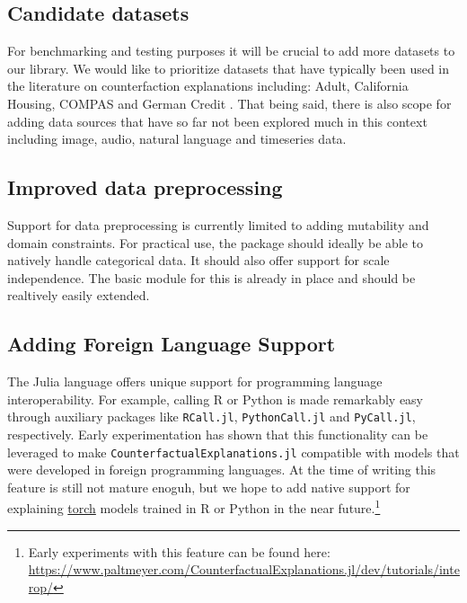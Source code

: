 \documentclass{juliacon}
\begin{document}
\hypertarget{candidate-datasets}{%
\subsection{Candidate datasets}\label{candidate-datasets}}

For benchmarking and testing purposes it will be crucial to add more
datasets to our library. We would like to prioritize datasets that have
typically been used in the literature on counterfaction explanations
including: Adult, California Housing, COMPAS and German Credit
\cite{karimi2020survey}. That being said, there is also scope for adding
data sources that have so far not been explored much in this context
including image, audio, natural language and timeseries data.

\hypertarget{improved-data-preprocessing}{%
\subsection{Improved data
preprocessing}\label{improved-data-preprocessing}}

Support for data preprocessing is currently limited to adding mutability
and domain constraints. For practical use, the package should ideally be
able to natively handle categorical data. It should also offer support
for scale independence. The basic module for this is already in place
and should be realtively easily extended.

\hypertarget{sec-dis-foreign}{%
\subsection{Adding Foreign Language Support}\label{sec-dis-foreign}}

The Julia language offers unique support for programming language
interoperability. For example, calling R or Python is made remarkably
easy through auxiliary packages like \texttt{RCall.jl},
\texttt{PythonCall.jl} and \texttt{PyCall.jl}, respectively. Early
experimentation has shown that this functionality can be leveraged to
make \texttt{CounterfactualExplanations.jl} compatible with models that
were developed in foreign programming languages. At the time of writing
this feature is still not mature enoguh, but we hope to add native
support for explaining \href{https://pytorch.org/}{torch} models trained
in R or Python in the near future.\footnote{Early experiments with this
  feature can be found here:
  \url{https://www.paltmeyer.com/CounterfactualExplanations.jl/dev/tutorials/interop/}}
\end{document}
